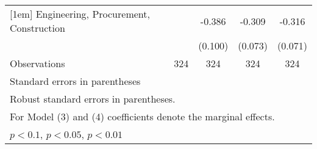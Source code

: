 {\begin{tabular}{l*{4}{c}}
[1em]
Engineering, Procurement, Construction&                     &      -0.386\sym{***}&      -0.309\sym{***}&      -0.316\sym{***}\\
                    &                     &     (0.100)         &     (0.073)         &     (0.071)         \\
\hline
Observations        &         324         &         324         &         324         &         324         \\
\hline\hline
\multicolumn{5}{l}{\footnotesize Standard errors in parentheses}\\
\multicolumn{5}{l}{\footnotesize Robust standard errors in parentheses.}\\
\multicolumn{5}{l}{\footnotesize For Model (3) and (4) coefficients denote the marginal effects.}\\
\multicolumn{5}{l}{\footnotesize \sym{*} \(p<0.1\), \sym{**} \(p<0.05\), \sym{***} \(p<0.01\)}\\
\end{tabular}
}
